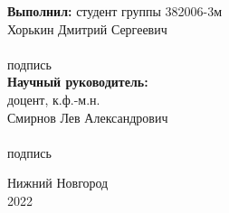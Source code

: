 \begin{titlepage}
\begin{minipage}[t]{.36\linewidth}
\begin{flushleft}
			\textbf{Выполнил:} студент группы 382006-3м \\
			Хорькин Дмитрий Сергеевич\\
			\vspace{1.0em}
			\hrulefill  \\
			{\small подпись}\\
			
			\vspace{1.5em}
			\textbf{Научный руководитель:}\\
		доцент, к.ф.-м.н.\\
			Смирнов Лев Александрович\\
			\vspace{1.0em}
			\hrulefill  \\
			{\small подпись}
			
    	\end{flushleft}
    \end{minipage}

	\vspace{\fill}

	\begin{center}
		Нижний Новгород \\
		2022
	\end{center}

\end{titlepage}